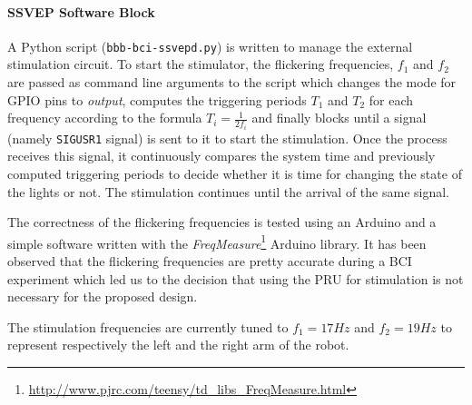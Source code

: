 \documentclass[12pt]{article}
\newcommand\mysubsubsubsection[1]{\paragraph{#1}\hspace{0pt}}
\numberwithin{equation}{section}
\numberwithin{figure}{section}
\numberwithin{table}{section}
\begin{document}
\mysubsubsubsection{SSVEP Software Block}
\par{
    A Python script (\texttt{bbb-bci-ssvepd.py}) is written to manage the external stimulation circuit.
    To start the stimulator, the flickering frequencies, $f_1$ and $f_2$ are passed as command line arguments to the
    script which changes the mode for GPIO pins to \emph{output}, computes
    the triggering periods $T_1$ and $T_2$ for each frequency according to
    the formula $T_i=\frac{1}{2f_i}$ and finally blocks until a signal (namely
    \texttt{SIGUSR1} signal) is sent to it to start the stimulation.
    Once the process receives this signal, it continuously compares the system time and
    previously computed triggering periods to decide whether it is time for
    changing the state of the lights or not. The stimulation continues until
    the arrival of the same signal.
}
\par{
    The correctness of the flickering frequencies is tested using an Arduino and a simple
    software written with the \emph{FreqMeasure}\footnote{\url{http://www.pjrc.com/teensy/td_libs_FreqMeasure.html}} Arduino library.
    It has been observed that the flickering frequencies are pretty accurate during a BCI experiment which led us to the decision
    that using the PRU for stimulation is not necessary for the proposed design.
}
\par{
    The stimulation frequencies are currently tuned to $f_1=17Hz$ and $f_2=19Hz$ to represent respectively
    the left and the right arm of the robot.
}
\end{document}
